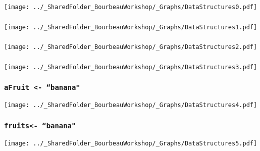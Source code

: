 \documentclass{beamer}
\begin{document}
    \begin{frame}
        \frametitle{} \vspace{0.7cm}
        \begin{center}
            \texttt{[image: ../\_SharedFolder\_BourbeauWorkshop/\_Graphs/DataStructures0.pdf]}
        \end{center}
    \end{frame}

    \begin{frame}
        \frametitle{} \vspace{0.7cm}
        \begin{center}
            \texttt{[image: ../\_SharedFolder\_BourbeauWorkshop/\_Graphs/DataStructures1.pdf]}
        \end{center}
    \end{frame}

    \begin{frame}
        \frametitle{} \vspace{0.7cm}
        \begin{center}
            \texttt{[image: ../\_SharedFolder\_BourbeauWorkshop/\_Graphs/DataStructures2.pdf]}
        \end{center}
    \end{frame}

    \begin{frame}
        \frametitle{} \vspace{0.7cm}
        \begin{center}
            \texttt{[image: ../\_SharedFolder\_BourbeauWorkshop/\_Graphs/DataStructures3.pdf]}
        \end{center}
    \end{frame}

    \begin{frame}
        \frametitle{\texttt{aFruit <- ``banana"}} \vspace{0.6cm}
        \begin{center}
            \texttt{[image: ../\_SharedFolder\_BourbeauWorkshop/\_Graphs/DataStructures4.pdf]}
        \end{center}
    \end{frame}

    \begin{frame}
        \frametitle{\texttt{fruits\rbrack <- ``banana"}} \vspace{0.6cm}
        \begin{center}
            \texttt{[image: ../\_SharedFolder\_BourbeauWorkshop/\_Graphs/DataStructures5.pdf]}
        \end{center}
    \end{frame}
\end{document}
